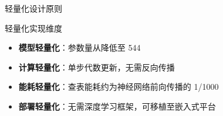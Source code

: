 \begin{frame}{轻量化设计原则}
    \begin{exampleblock}{\normalsize 轻量化实现维度}
        \footnotesize
        \begin{itemize}
            \item \textbf{模型轻量化}：参数量从降低至 544
            \item \textbf{计算轻量化}：单步代数更新，无需反向传播
            \item \textbf{能耗轻量化}：查表能耗约为神经网络前向传播的 1/1000
            \item \textbf{部署轻量化}：无需深度学习框架，可移植至嵌入式平台
        \end{itemize}
    \end{exampleblock}
\end{frame}

